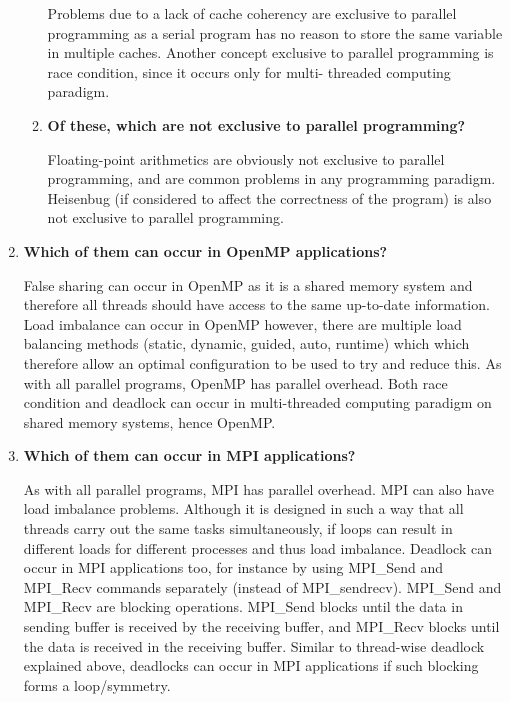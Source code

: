 \documentclass[10pt, letterpaper, twoside]{article}
\begin{document}
\begin{titlepage}
\begin{enumerate}
\begin{enumerate}
Problems due to a lack of cache coherency are exclusive to parallel programming as a serial program has no reason to store the same variable in multiple caches. Another concept exclusive to parallel programming is race condition, since it occurs only for multi-
threaded computing paradigm. 

\item \textbf{Of these, which are not exclusive to parallel programming?} 

Floating-point arithmetics are obviously not exclusive to parallel programming, and are common problems in any programming paradigm.
Heisenbug (if considered to affect the correctness of the program) is also not exclusive to parallel programming.\\
\end{enumerate}

\item\textbf{Which of them can occur in OpenMP applications?}
 
False sharing can occur in OpenMP as it is a shared memory system and therefore all threads should have access to the same up-to-date information. Load imbalance can occur in OpenMP however, there are multiple load balancing methods (static, dynamic, guided, auto, runtime) which which therefore allow an optimal configuration to be used to try and reduce this. As with all parallel programs, OpenMP has parallel overhead. Both race condition and deadlock can occur in
multi-threaded computing paradigm on shared memory systems, hence OpenMP.	\\

\item\textbf{Which of them can occur in MPI applications?} 

As with all parallel programs, MPI has parallel overhead. MPI can also have load imbalance problems. Although it is designed in such a way that all threads carry out the same tasks simultaneously, if loops can result in different loads for different processes and thus
load imbalance. Deadlock can occur in MPI applications too, for instance by using MPI\_Send and MPI\_Recv commands separately (instead of MPI\_sendrecv). MPI\_Send and MPI\_Recv are blocking operations. MPI\_Send blocks until the data in sending buffer is received by the receiving buffer, and MPI\_Recv blocks until the data is received in the receiving buffer. Similar to thread-wise deadlock explained above, deadlocks can occur in MPI applications if such blocking forms a loop/symmetry. \\


\end{enumerate}
\end{titlepage}
\end{document}
